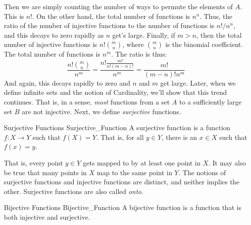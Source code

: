                 Then we are simply counting the number of ways to
                permute the elements of $A$. This is $n!$. On the
                other hand, the total number of functions is
                $n^{n}$. Thus, the ratio of the number of injective
                functions to the number of functions is
                $n!/n^{n}$, and this decays to zero rapidly as
                $n$ get's large. Finally, if $m>n$, then the total
                number of injective functions is
                $n!\binom{m}{n}$, where $\binom{m}{n}$ is the
                binomial coefficient. The total number of functions
                is $n^{m}$. The ratio is thus:
                \begin{equation}
                    \frac{n!\binom{m}{n}}{n^{m}}=
                    \frac{n!\frac{m!}{n!(m-n)!}}{n^{m}}
                    =\frac{m!}{(m-n)!n^{m}}
                \end{equation}
                And again, this decays rapidly to zero and $n$ and $m$
                get large. Later, when we define infinite sets
                and the notion of Cardinality, we'll show that this
                trend continues. That is, in a sense, \textit{most}
                functions from a set $A$ to a sufficiently large set
                $B$ are not injective. Next, we define
                \textit{surjective} functions.
                \begin{ldefinition}{Surjective Functions}
                      {Surjective_Function}
                    A \gls{surjective function} is a function
                    $f:X\rightarrow{Y}$ such that $f(X)=Y$.
                    That is, for all $y\in{Y}$, there is an
                    $x\in{X}$ such that $f(x)=y$.
                \end{ldefinition}
                That is, every point $y\in{Y}$ gets mapped to by
                at least one point in $X$. It may also be true that
                many points in $X$ map to the same point in $Y$.
                The notions of surjective functions and injective
                functions are distinct, and neither implies the
                other. Surjective functions are also called
                \textit{onto}.
                \begin{ldefinition}{Bijective Functions}
                      {Bijective_Function}
                    A \gls{bijective function} is a function
                    that is both injective and surjective.
                \end{ldefinition}
